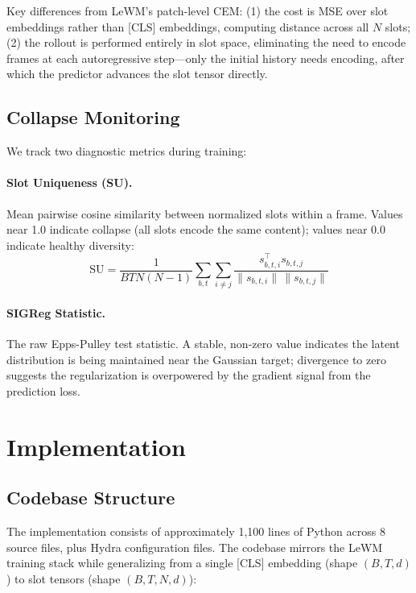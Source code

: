 \documentclass[12pt]{article}
\begin{document}
Key differences from LeWM's patch-level CEM: (1) the cost is MSE over slot embeddings rather than [CLS] embeddings, computing distance across all $N$ slots; (2) the rollout is performed entirely in slot space, eliminating the need to encode frames at each autoregressive step---only the initial history needs encoding, after which the predictor advances the slot tensor directly.

\subsection{Collapse Monitoring}

We track two diagnostic metrics during training:

\paragraph{Slot Uniqueness (SU).} Mean pairwise cosine similarity between normalized slots within a frame. Values near 1.0 indicate collapse (all slots encode the same content); values near 0.0 indicate healthy diversity:
\begin{equation}
\text{SU} = \frac{1}{BTN(N-1)}\sum_{b,t}\sum_{i \neq j} \frac{s_{b,t,i}^\top s_{b,t,j}}{\|s_{b,t,i}\| \, \|s_{b,t,j}\|}
\end{equation}

\paragraph{SIGReg Statistic.} The raw Epps-Pulley test statistic. A stable, non-zero value indicates the latent distribution is being maintained near the Gaussian target; divergence to zero suggests the regularization is overpowered by the gradient signal from the prediction loss.

\section{Implementation}

\subsection{Codebase Structure}

The implementation consists of approximately 1,100 lines of Python across 8 source files, plus Hydra configuration files. The codebase mirrors the LeWM training stack while generalizing from a single [CLS] embedding (shape $(B, T, d)$) to slot tensors (shape $(B, T, N, d)$):
\end{document}
